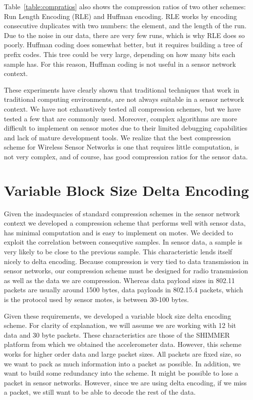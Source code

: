 Table~\ref{table:compratios} also shows the compression ratios of two
other schemes: Run Length Encoding (RLE) and Huffman encoding. RLE
works by encoding consecutive duplicates with two numbers: the
element, and the length of the run. Due to the noise in our data,
there are very few runs, which is why RLE does so poorly. Huffman
coding does somewhat better, but it requires building a tree of prefix
codes. This tree could be very large, depending on how many bits each
sample has. For this reason, Huffman coding is not useful in a sensor
network context. 

These experiments have clearly shown that traditional techniques that
work in traditional computing environments, are not always suitable in
a sensor network context. We have not exhaustively tested all
compression schemes, but we have tested a few that are commonly
used. Moreover, complex algorithms are more difficult to implement on
sensor motes due to their limited debugging capabilities and lack of
mature development tools. We realize that the best compression scheme
for Wireless Sensor Networks is one that requires little computation,
is not very complex, and of course, has good compression ratios for
the sensor data.

\section{Variable Block Size Delta Encoding}

Given the inadequacies of standard compression schemes in the sensor
network context we developed a compression scheme that performs well
with sensor data, has minimal computation and is easy to implement on
motes. We decided to exploit the correlation between consequtive
samples. In sensor data, a sample is very likely to be close to the
previous sample. This characteristic lends itself nicely to delta
encoding. Because compression is very tied to data transmission in
sensor networks, our compression scheme must be designed for radio
transmission as well as the data we are compression. Whereas data
payload sizes in 802.11 packets are usually around 1500 bytes, data
payloads in 802.15.4 packets, which is the protocol used by sensor
motes, is between 30-100 bytes.

Given these requirements, we developed a variable block size delta
encoding scheme. For clarity of explanation, we will assume we are
working with 12 bit data and 30 byte packets. These characteristics
are those of the SHIMMER platform from which we obtained the
accelerometer data. However, this scheme works for higher order data
and large packet sizes. All packets are fixed size, so we want to pack
as much information into a packet as possible. In addition, we want to
build some redundancy into the scheme. It might be possible to lose a
packet in sensor networks. However, since we are using delta encoding,
if we miss a packet, we still want to be able to decode the rest of
the data.

